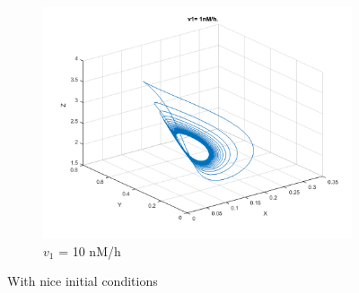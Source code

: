 \documentclass[10pt,a4paper,oneside,twocolumn]{article}
\numberwithin{equation}{section} %
\begin{document}
\begin{figure}
\begin{subfigure}[b]{0.32\textwidth}
	    \includegraphics[width=\textwidth]{LotsofthesameA/A-AA10.png}
	    \caption{$v_1$ = 10 nM/h}
	\end{subfigure}
	
	\caption{With nice initial conditions}
    \end{figure}
\end{document}
